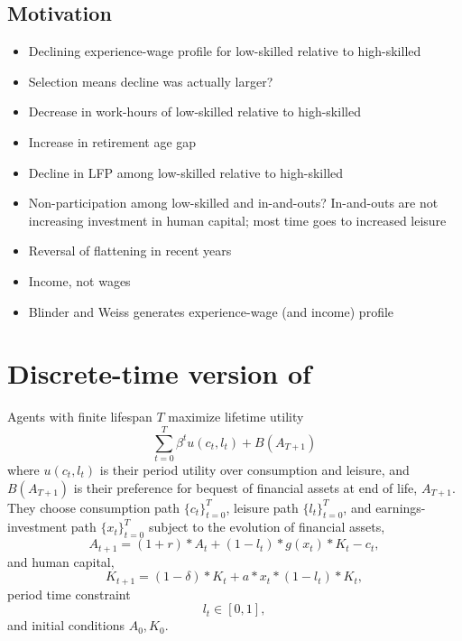 \documentclass[12pt]{article}
\begin{document}
\subsection{Motivation}
\begin{itemize}
    \item Declining experience-wage profile for low-skilled relative to high-skilled
    \item Selection means decline was actually larger?
    \item Decrease in work-hours of low-skilled relative to high-skilled
    \item Increase in retirement age gap
    \item Decline in LFP among low-skilled relative to high-skilled
    \item Non-participation among low-skilled and in-and-outs? In-and-outs are not increasing investment in human capital; most time goes to increased leisure
    \item Reversal of flattening in recent years
    \item Income, not wages
    \item Blinder and Weiss generates experience-wage (and income) profile
\end{itemize}

\fi

\section{Discrete-time version of \textcite{blinder_weiss_1976_lifecycle_human_capital_labor_supply_synthesis}}
Agents with finite lifespan $T$ maximize lifetime utility
\begin{equation}
    \sum_{t=0}^{T} \beta^t u(c_t, l_t) + B(A_{T+1})
\end{equation}
where $u(c_t, l_t)$ is their period utility over consumption and leisure, and $B(A_{T+1})$ is their preference for bequest of financial assets at end of life, $A_{T+1}$.
They choose consumption path $\{ c_t \}_{t=0}^T $, leisure path $\{ l_t \}_{t=0}^T $, and earnings-investment path $\{ x_t \}_{t=0}^T $ subject to the evolution of financial assets,
\begin{equation}
    A_{t+1} = (1+r)*A_{t} + (1-l_{t})*g(x_t)*K_{t} - c_{t},
\end{equation}
and human capital,
\begin{equation}
    K_{t+1} = (1-\delta)*K_t + a*x_t*(1-l_t)*K_t,
\end{equation}
period time constraint
\begin{equation}
    l_t \in [0,1],
\end{equation}
and initial conditions $A_0, K_0$.
\end{document}
